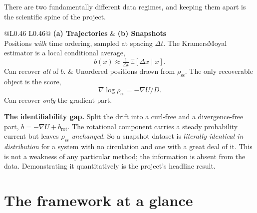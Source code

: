 \documentclass[11pt,a4paper]{article}
\begin{document}
There are two fundamentally different data regimes, and keeping them apart is the
scientific spine of the project.

\begin{center}
\begin{tabular}{@{}L{0.46\textwidth} L{0.46\textwidth}@{}}
\toprule
\textbf{(a) Trajectories} & \textbf{(b) Snapshots} \\
\midrule
Positions \emph{with} time ordering, sampled at spacing $\Delta t$.
The Kramers\textendash{}Moyal estimator is a local conditional average,
\[ b(x)\approx\tfrac{1}{\Delta t}\,\mathbb{E}\!\left[\Delta x \mid x\right]. \]
Can recover \emph{all} of $b$.
&
Unordered positions drawn from $\rho_{\mathrm{ss}}$. The only recoverable object is the
score,
\[ \nabla\log\rho_{\mathrm{ss}} = -\nabla U/D . \]
Can recover \emph{only} the gradient part.
\\
\bottomrule
\end{tabular}
\end{center}

\begin{keybox}
\textbf{The identifiability gap.} Split the drift into a curl-free and a
divergence-free part, $b = -\nabla U + b_{\mathrm{rot}}$. The rotational component
carries a steady probability current but leaves $\rho_{\mathrm{ss}}$ \emph{unchanged}.
So a snapshot dataset is \emph{literally identical in distribution} for a system with
no circulation and one with a great deal of it. This is not a weakness of any
particular method; the information is absent from the data. Demonstrating it
quantitatively is the project's headline result.
\end{keybox}

\section{The framework at a glance}
\end{document}
